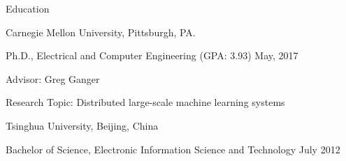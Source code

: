\documentclass{resume} %
\begin{document}
\begin{rSection}{Education}

\begin{rSubsection}{\hspace{-1em} Carnegie Mellon University, Pittsburgh, PA.}{}{}{}
\vspace{-0.3em}
\item[] \hspace{-2em} Ph.D., Electrical and Computer Engineering (GPA: 3.93) \hfill May, 2017
\item Advisor: Greg Ganger
\item Research Topic: Distributed large-scale machine learning systems
\end{rSubsection}

\begin{rSubsection}{\hspace{-1em} Tsinghua University, Beijing, China}{}{}{}
\vspace{-0.3em}
\item[] \hspace{-2em} Bachelor of Science, Electronic Information Science and Technology \hfill July 2012
\end{rSubsection}

\end{rSection}
\vspace{-.05in}
\end{document}
